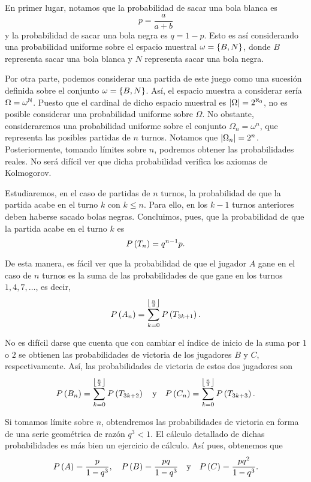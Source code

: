 \begin{solution}
  En primer lugar, notamos que la probabilidad de sacar una bola blanca es
  \[
    p = \frac{a}{a + b}
  \]
  y la probabilidad de sacar una bola negra es $q = 1 - p$. Esto es así
  considerando una probabilidad uniforme sobre el espacio muestral
  $\omega = \left\lbrace B, N\right\rbrace$, donde $B$ representa sacar una bola blanca y $N$
  representa sacar una bola negra.

  Por otra parte, podemos considerar una partida de este juego como una
  sucesión definida sobre el conjunto $\omega = \left\lbrace B, N\right\rbrace$. Así, el
  espacio muestra a considerar sería $\Omega = \omega^{\mathbb{N}}$. Puesto que el
  cardinal de dicho espacio muestral es $\left|\Omega\right| = 2^{\aleph_0}$, no
  es posible considerar una probabilidad uniforme sobre $\Omega$. No
  obstante, consideraremos una probabilidad uniforme sobre el conjunto
  $\Omega_n = \omega^n$, que representa las posibles partidas de $n$
  turnos. Notamos que $\left|\Omega_n\right| = 2^n$. Posteriormente, tomando
  límites sobre $n$, podremos obtener las probabilidades reales. No será
  difícil ver que dicha probabilidad verifica los axiomas de Kolmogorov.

  Estudiaremos, en el caso de partidas de $n$ turnos, la probabilidad de
  que la partida acabe en el turno $k$ con $k \le n$. Para ello, en 
  los $k - 1$ turnos anteriores deben haberse sacado bolas negras.
  Concluimos, pues, que la probabilidad de que la partida acabe en el
  turno $k$ es
  \[
    P\left(T_n\right) = q^{n - 1} p.
  \]

  De esta manera, es fácil ver que la probabilidad de que el jugador $A$
  gane en el caso de $n$ turnos es la suma de las probabilidades de que
  gane en los turnos $1, 4, 7, \ldots$, es decir,
  \[
    P\left(A_n\right) = \sum_{k = 0}^{\left\lfloor\frac{n}{3}\right\rfloor} P\left(T_{3k + 1}\right).
  \]

  No es difícil darse que cuenta que con cambiar el índice de inicio de la
  suma por $1$ o $2$ se obtienen las probabilidades de victoria de los
  jugadores $B$ y $C$, respectivamente. Así, las probabilidades de victoria
  de estos dos jugadores son
  \[
    P\left(B_n\right) = \sum_{k = 0}^{\left\lfloor\frac{n}{3}\right\rfloor} P\left(T_{3k + 2}\right)
    \quad \text{y} \quad
    P\left(C_n\right) = \sum_{k = 0}^{\left\lfloor\frac{n}{3}\right\rfloor} P\left(T_{3k + 3}\right).
  \]

  Si tomamos límite sobre $n$, obtendremos las probabilidades de victoria
  en forma de una serie geométrica de razón $q^3 < 1$. El cálculo detallado
  de dichas probabilidades es más bien un ejercicio de cálculo. Así pues,
  obtenemos que
  \[
    P\left(A\right) = \frac{p}{1 - q^3}, \quad
    P\left(B\right) = \frac{pq}{1 - q^3} \quad \text{y} \quad
    P\left(C\right) = \frac{pq^2}{1 - q^3}.
  \]
\end{solution}

